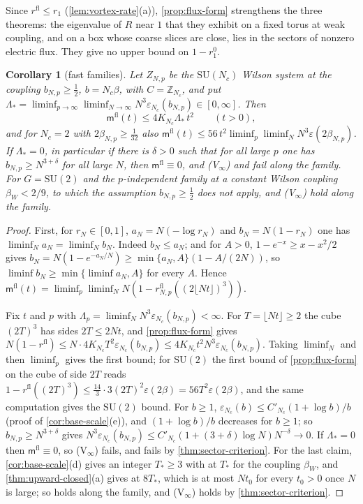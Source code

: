 \documentclass[11pt,a4paper]{amsart}
\newtheorem{corollary}[theorem]{Corollary}
\theoremstyle{definition}
\theoremstyle{remark}
\numberwithin{equation}{section}
\newcommand{\Z}{\mathbb{Z}}          %
\newcommand{\SU}{\mathrm{SU}}              %
\newcommand{\cube}[1]{(2#1)^3}             %
\newcommand{\Mcirc}{\text{\upshape(M$^{\circ}$)}}   %
\newcommand{\Bcirc}{\text{\upshape(B$^{\circ}$)}}   %
\newcommand{\tzero}{t_0}                   %
\newcommand{\betaW}{\beta_{W}}             %
\begin{document}
Since $r^{\mathrm{fl}}\le r_1$ (\cref{lem:vortex-rate}\textup{(a)}), \cref{prop:flux-form} strengthens the three theorems: the eigenvalue of $R$ near $1$ that they exhibit on a fixed torus at weak coupling, and on a box whose coarse slices are close, lies in the sectors of nonzero electric flux. They give no upper bound on $1-r_1^0$.

\begin{corollary}[fast families]\label{cor:fast-vortex}
Let $Z_{N,p}$ be the $\SU(N_c)$ Wilson system at the coupling $b_{N,p}\ge\frac12$, $b=N_c\beta$, with $C=\Z_{N_c}$, and put $\Lambda_*=\liminf_{p\to\infty}\liminf_{N\to\infty}N^3\varepsilon_{N_c}(b_{N,p})\in[0,\infty]$. Then
\[
\mathsf m^{\mathrm{fl}}(t)\le4K_{N_c}\Lambda_*\,t^2\qquad(t>0),
\]
and for $N_c=2$ with $2\beta_{N,p}\ge\frac1{32}$ also $\mathsf m^{\mathrm{fl}}(t)\le56\,t^2\liminf_p\liminf_NN^3\varepsilon(2\beta_{N,p})$. If $\Lambda_*=0$, in particular if there is $\delta>0$ such that for all large $p$ one has $b_{N,p}\ge N^{3+\delta}$ for all large $N$, then $\mathsf m^{\mathrm{fl}}\equiv0$, and \textup{(V$_\infty$)} and \Mcirc{} fail along the family. For $G=\SU(2)$ and the $p$-independent family at a constant Wilson coupling $\betaW<2/9$, to which the assumption $b_{N,p}\ge\frac12$ does not apply, \Mcirc{} and \textup{(V$_\infty$)} hold along the family.
\end{corollary}

\begin{proof}
First, for $r_N\in[0,1]$, $a_N=N(-\log r_N)$ and $b_N=N(1-r_N)$ one has $\liminf_Na_N=\liminf_Nb_N$. Indeed $b_N\le a_N$; and for $A>0$, $1-e^{-x}\ge x-x^2/2$ gives $b_N=N(1-e^{-a_N/N})\ge\min\{a_N,A\}(1-A/(2N))$, so $\liminf b_N\ge\min\{\liminf a_N,A\}$ for every $A$. Hence $\mathsf m^{\mathrm{fl}}(t)=\liminf_p\liminf_NN(1-r^{\mathrm{fl}}_{N,p}(\cube{\lfloor Nt\rfloor}))$.

Fix $t$ and $p$ with $\Lambda_p=\liminf_NN^3\varepsilon_{N_c}(b_{N,p})<\infty$. For $T=\lfloor Nt\rfloor\ge2$ the cube $\cube T$ has sides $2T\le2Nt$, and \cref{prop:flux-form} gives $N(1-r^{\mathrm{fl}})\le N\cdot4K_{N_c}T^2\varepsilon_{N_c}(b_{N,p})\le4K_{N_c}t^2N^3\varepsilon_{N_c}(b_{N,p})$. Taking $\liminf_N$ and then $\liminf_p$ gives the first bound; for $\SU(2)$ the first bound of \cref{prop:flux-form} on the cube of side $2T$ reads $1-r^{\mathrm{fl}}(\cube T)\le\tfrac{14}{3}\cdot3(2T)^2\varepsilon(2\beta)=56T^2\varepsilon(2\beta)$, and the same computation gives the $\SU(2)$ bound. For $b\ge1$, $\varepsilon_{N_c}(b)\le C'_{N_c}(1+\log b)/b$ (proof of \cref{cor:base-scale}\textup{(e)}), and $(1+\log b)/b$ decreases for $b\ge1$; so $b_{N,p}\ge N^{3+\delta}$ gives $N^3\varepsilon_{N_c}(b_{N,p})\le C'_{N_c}(1+(3+\delta)\log N)N^{-\delta}\to0$. If $\Lambda_*=0$ then $\mathsf m^{\mathrm{fl}}\equiv0$, so \textup{(V$_\infty$)} fails, and \Mcirc{} fails by \cref{thm:sector-criterion}. For the last claim, \cref{cor:base-scale}\textup{(d)} gives an integer $T_*\ge3$ with \Bcirc{} at $T_*$ for the coupling $\betaW$, and \cref{thm:upward-closed}\textup{(a)} gives \Mcirc{} at $8T_*$, which is at most $N\tzero$ for every $\tzero>0$ once $N$ is large; so \Mcirc{} holds along the family, and \textup{(V$_\infty$)} holds by \cref{thm:sector-criterion}.
\end{proof}
\end{document}
